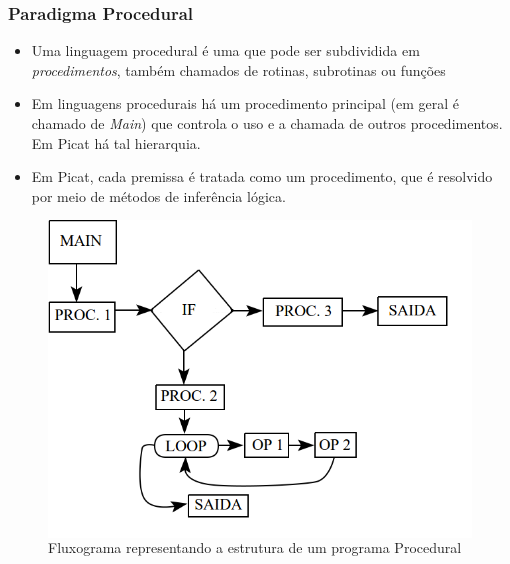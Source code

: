 
\begin{frame}[fragile]
	\frametitle{Paradigma Procedural}
    
    \begin{itemize}
    
    	\item Uma linguagem procedural é uma que pode ser subdividida em \textit{procedimentos},
        também chamados de rotinas, subrotinas ou funções
        
        \pause
        \item Em linguagens procedurais há um procedimento principal (em geral é chamado de 
        \textit{Main}) que controla o uso e a chamada de outros procedimentos. Em Picat há
        tal hierarquia.
        
        \pause
        \item Em Picat, cada premissa é tratada como um procedimento, que é resolvido por meio
        de métodos de inferência lógica.
       
    \end{itemize}
    
\framebreak
    
    \begin{figure}
    	\begin{columns}
	         \includegraphics[width=.8\textwidth] {figures/Paradigma_Procedural.png}
             \caption{Fluxograma representando a estrutura de um programa Procedural}
	         \label{Fluxograma Procedural}
		\end{columns}
	\end{figure}
    
\end{frame}

